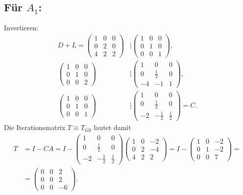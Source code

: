 \documentclass[english, parskip=full]{scrartcl}
\begin{document}
\subsection*{Für $A_1$:}
Invertieren: 
\begin{align}
D+L = \begin{pmatrix}
1 & 0 & 0 \\ 0 & 2 & 0 \\ 4 & 2 & 2
\end{pmatrix} &\Bigg\vert \begin{pmatrix}
1 & 0 & 0 \\ 0 & 1 & 0 \\ 0 & 0 & 1
\end{pmatrix},\\
\begin{pmatrix}
1 & 0 & 0 \\ 0 & 1 & 0 \\ 0 & 0 & 2
\end{pmatrix} &\Bigg\vert \begin{pmatrix}
1 & 0 & 0 \\ 0 & \frac{1}{2} & 0 \\ -4 & -1 & 1
\end{pmatrix},\\
\begin{pmatrix}
1 & 0 & 0 \\ 0 & 1 & 0 \\ 0 & 0 & 1
\end{pmatrix} &\Bigg\vert \begin{pmatrix}
1 & 0 & 0 \\ 0 & \frac{1}{2} & 0 \\ -2 & -\frac{1}{2} & \frac{1}{2}
\end{pmatrix} = C.
\end{align}
Die Iterationsmatrix $T\equiv T_\text{GS}$ lautet damit
\begin{align}
T &= I - CA = I - \begin{pmatrix}
1 & 0 & 0 \\ 0 & \frac{1}{2} & 0 \\ -2 & -\frac{1}{2} & \frac{1}{2}
\end{pmatrix}\begin{pmatrix}
1 & 0 & -2 \\ 0 & 2 & -4 \\ 4 & 2 & 2
\end{pmatrix} = I - \begin{pmatrix}
1 & 0 & -2 \\ 0 & 1 & -2 \\ 0 & 0 & 7
\end{pmatrix} = \\
&= \begin{pmatrix}
0 & 0 & 2 \\ 0 & 0 & 2 \\ 0 & 0 & -6
\end{pmatrix}.
\end{align}
\end{document}
